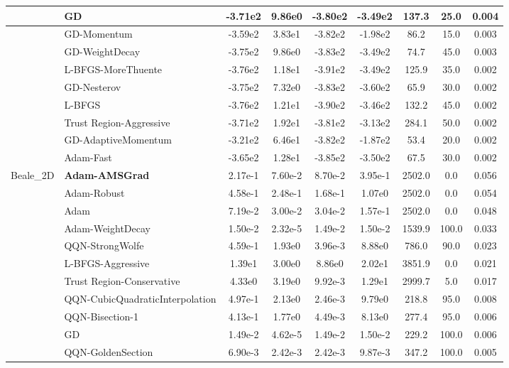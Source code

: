 \documentclass[10pt]{article}
\begin{document}
\begin{longtable}{|l|l|c|c|c|c|c|c|c|}
\hline
 & GD & -3.71e2 & 9.86e0 & -3.80e2 & -3.49e2 & 137.3 & 25.0 & 0.004 \\
\hline
 & GD-Momentum & -3.59e2 & 3.83e1 & -3.82e2 & -1.98e2 & 86.2 & 15.0 & 0.003 \\
\hline
 & GD-WeightDecay & -3.75e2 & 9.86e0 & -3.83e2 & -3.49e2 & 74.7 & 45.0 & 0.003 \\
\hline
 & L-BFGS-MoreThuente & -3.76e2 & 1.18e1 & -3.91e2 & -3.49e2 & 125.9 & 35.0 & 0.002 \\
\hline
 & GD-Nesterov & -3.75e2 & 7.32e0 & -3.83e2 & -3.60e2 & 65.9 & 30.0 & 0.002 \\
\hline
 & L-BFGS & -3.76e2 & 1.21e1 & -3.90e2 & -3.46e2 & 132.2 & 45.0 & 0.002 \\
\hline
 & Trust Region-Aggressive & -3.71e2 & 1.92e1 & -3.81e2 & -3.13e2 & 284.1 & 50.0 & 0.002 \\
\hline
 & GD-AdaptiveMomentum & -3.21e2 & 6.46e1 & -3.82e2 & -1.87e2 & 53.4 & 20.0 & 0.002 \\
\hline
 & Adam-Fast & -3.65e2 & 1.28e1 & -3.85e2 & -3.50e2 & 67.5 & 30.0 & 0.002 \\
Beale\_2D & \textbf{Adam-AMSGrad} & 2.17e-1 & 7.60e-2 & 8.70e-2 & 3.95e-1 & 2502.0 & 0.0 & 0.056 \\
\hline
 & Adam-Robust & 4.58e-1 & 2.48e-1 & 1.68e-1 & 1.07e0 & 2502.0 & 0.0 & 0.054 \\
\hline
 & Adam & 7.19e-2 & 3.00e-2 & 3.04e-2 & 1.57e-1 & 2502.0 & 0.0 & 0.048 \\
\hline
 & Adam-WeightDecay & 1.50e-2 & 2.32e-5 & 1.49e-2 & 1.50e-2 & 1539.9 & 100.0 & 0.033 \\
\hline
 & QQN-StrongWolfe & 4.59e-1 & 1.93e0 & 3.96e-3 & 8.88e0 & 786.0 & 90.0 & 0.023 \\
\hline
 & L-BFGS-Aggressive & 1.39e1 & 3.00e0 & 8.86e0 & 2.02e1 & 3851.9 & 0.0 & 0.021 \\
\hline
 & Trust Region-Conservative & 4.33e0 & 3.19e0 & 9.92e-3 & 1.29e1 & 2999.7 & 5.0 & 0.017 \\
\hline
 & QQN-CubicQuadraticInterpolation & 4.97e-1 & 2.13e0 & 2.46e-3 & 9.79e0 & 218.8 & 95.0 & 0.008 \\
\hline
 & QQN-Bisection-1 & 4.13e-1 & 1.77e0 & 4.49e-3 & 8.13e0 & 277.4 & 95.0 & 0.006 \\
\hline
 & GD & 1.49e-2 & 4.62e-5 & 1.49e-2 & 1.50e-2 & 229.2 & 100.0 & 0.006 \\
\hline
 & QQN-GoldenSection & 6.90e-3 & 2.42e-3 & 2.42e-3 & 9.87e-3 & 347.2 & 100.0 & 0.005 \\

\end{longtable}
\end{document}
